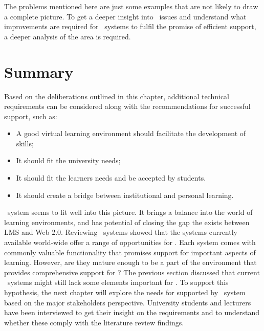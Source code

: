 The problems mentioned here are just some examples that are not likely to draw a
complete picture. To get a deeper insight into \ep~issues and understand what
improvements are required for \ep~systems to fulfil the promise of efficient
\LLLs support, a deeper analysis of the area is required.

\section{Summary}

Based on the deliberations outlined in this chapter, additional technical
requirements can be considered along with the recommendations for successful
\LLLs support, such as:

\begin{itemize}
	\item A good virtual learning environment should facilitate the development of
	\LLLs skills;
	\item It should fit the university needs;
	\item It should fit the learners needs and be accepted by students. 
	\item It should create a bridge between institutional and personal learning.
\end{itemize}

\ep~system seems to fit well into this picture. It brings a balance into the
world of learning environments, and has potential of closing the gap the exists
between LMS and Web 2.0. Reviewing \ep~systems showed that the systems currently
available world-wide offer a range of opportunities for \LLLsn. Each system
comes with commonly valuable functionality that promises support for important
aspects of learning. However, are they mature enough to be a part of the
environment that provides comprehensive support for \LLLsn? The previous section
discussed that current \ep~systems might still lack some elements important for
\LLLsn. To support this hypothesis, the next chapter will explore the needs for
\LLLs supported by \ep~system based on the major stakeholders perspective.
University students and lecturers have been interviewed to get their insight on
the requirements and to understand whether these comply with the literature
review findings.
